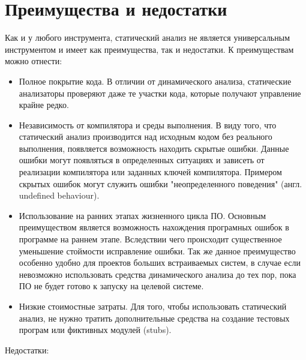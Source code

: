 \section{Преимущества и недостатки}
Как и у любого инструмента, статический анализ не является универсальным инструментом и имеет 
как преимущества, так и недостатки.
К преимуществам можно отнести:
\begin{itemize}
	\item Полное покрытие кода. 
	В отличии от динамического анализа, статические анализаторы проверяют даже те участки кода, 
которые получают управление крайне редко.

	\item Независимость от компилятора и среды выполнения.
	В виду того, что статический анализ производится над исходным кодом без реального выполнения,
появляется возможность находить скрытые ошибки. Данные ошибки могут появляться в определенных ситуациях 
и зависеть от реализации компилятора или заданных ключей компилятора. Примером скрытых ошибок могут
служить ошибки "неопределенного поведения" (англ. undefined behaviour).
	
	\item Использование на ранних этапах жизненного цикла ПО.
	Основным преимуществом является возможность нахождения програмных ошибок в программе на раннем этапе.
Вследствии чего происходит существенное уменьшение стоймости исправление ошибки. Так же данное 
преимущество особенно удобно для проектов больших встраиваемых систем, в случае если невозможно
использовать средства динамического анализа  до тех пор, пока ПО не будет готово к запуску на целевой системе.

	\item Низкие стоимостные затраты. 
	Для того, чтобы использовать статический анализ, не нужно тратить дополнительные средства 
на создание тестовых програм или фиктивных модулей (stubs).    
\end{itemize}
Недостатки:
